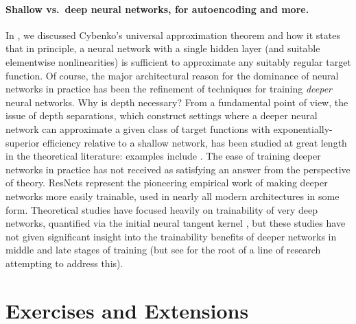 \documentclass[../../book-main.tex]{subfiles}
\begin{document}
\paragraph{Shallow vs.\ deep neural networks, for autoencoding and more.}
In , we discussed Cybenko's universal approximation
theorem and how it states that in principle, a neural network with a single
hidden layer (and suitable elementwise nonlinearities) is sufficient to
approximate any suitably regular target function. Of course, the
major architectural reason for the dominance of neural networks in practice has
been the refinement of techniques for training \textit{deeper} neural networks.
Why is depth necessary?
From a fundamental point of view, the issue of depth separations, which
construct settings where a deeper neural network can approximate a given class
of target functions with exponentially-superior efficiency relative to a shallow
network,
has been studied at great length in the theoretical literature:
examples include \cite{Telgarsky2016-sn,Bresler2020-xy,Venturi2021-qc}.
The ease of training deeper
networks in practice has not received as satisfying an answer from the
perspective of theory.
ResNets \cite{he2016deep} represent the pioneering empirical work of
making deeper networks more easily trainable, used in nearly all modern
architectures in some form. Theoretical studies have focused heavily on
trainability of very deep networks, quantified via the initial neural tangent
kernel \cite{Buchanan2021-sj,Martens2021-cx}, but these studies have not given
significant insight into the trainability benefits of deeper networks in middle
and late stages of training (but see \cite{Yang2021-gw} for the root of a line
of research attempting to address this).

\section{Exercises and Extensions}
\end{document}
